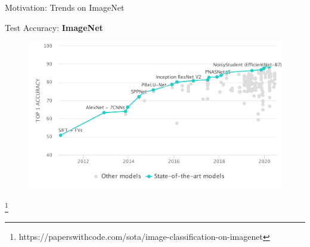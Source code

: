 \documentclass[mathserif,notheorems, hyperref={colorlinks, citecolor=blue, urlcolor=blue, linkcolor=blue}]{beamer}
\newcommand{\source}[1]{{\let\thefootnote\relax\footnote{{\tiny #1}}}}
\begin{document}
    \begin{frame}{Motivation: Trends on ImageNet} 
        \begin{center}
            \Large Test Accuracy: \textbf{ImageNet}
        \end{center}

        \begin{figure}[]
            \centering
            \includegraphics[width=\linewidth]{figures/ImageNet}
        \end{figure} 

        \source{https://paperswithcode.com/sota/image-classification-on-imagenet}
    \end{frame}
\end{document}
